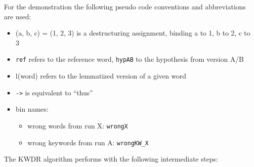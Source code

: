 \documentclass[]{article}
\providecommand{\tightlist}{%
  \setlength{\itemsep}{0pt}\setlength{\parskip}{0pt}}
\begin{document}
For the demonstration the following pseudo code conventions and
abbreviations are used:

\begin{itemize}
\tightlist
\item
  (a, b, c) = (1, 2, 3) is a destructuring assignment, binding a to 1, b
  to 2, c to 3
\item
  \texttt{ref} refers to the reference word, \texttt{hypA\textbar{}B} to
  the hypothesis from version A/B
\item
  l(word) refers to the lemmatized version of a given word
\item
  \texttt{-\textgreater{}} is equivalent to ``thus''
\item
  bin names:

  \begin{itemize}
  \tightlist
  \item
    wrong words from run X: \texttt{wrongX}
  \item
    wrong keywords from run A: \texttt{wrongKW\_X}
  \end{itemize}
\end{itemize}

The KWDR algorithm performs with the following intermediate steps:
\end{document}
